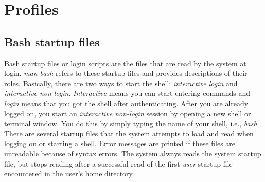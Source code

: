 \chapter{Profiles}
\pagestyle{fancy}
\label{ch:profiles}

\fancyhf{} %

\fancyhead[OC]{\leftmark} %

\setlength{\headheight}{13.6pt} 
\cfoot{\thepage} %

\section{Bash startup files}

Bash startup files or login scripts are the files that are read by the system at login. \emph{man bash} refers to these startup files and provides descriptions of their roles. Basically, there are two ways to start the shell: \emph{interactive login} and \emph{interactive non-login}. \emph{Interactive} means you can start entering commands and \emph{login} means that you got the shell after authenticating. After you are already logged on, you start an \emph{interactive non-login} session by opening a new shell or terminal window. You do this by simply typing the name of your shell, i.e., \emph{bash}. There are several startup files that the system attempts to load and read when logging on or starting a shell. Error messages are printed if these files are unreadable because of syntax errors. The system always reads the system startup file, but stops reading after a successful read of the first \emph{user} startup file encountered in the user's home directory.\\

